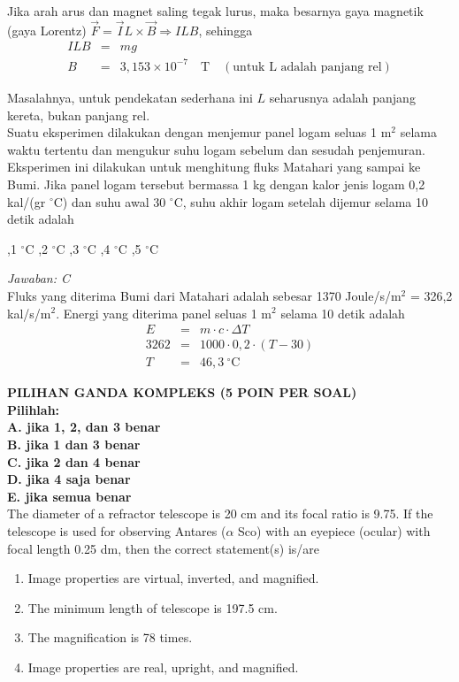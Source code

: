 \documentclass[11pt,fleqn]{exam}
\begin{document}
\begin{questions}
Jika arah arus dan magnet saling tegak lurus, maka besarnya gaya magnetik (gaya Lorentz) $\overrightarrow{F} = \overrightarrow{I}L \times \overrightarrow{B} \Rightarrow ILB$, sehingga
\begin{eqnarray*}
ILB &=& mg\\
B &=&3,153 \times 10^{-7} \quad \text{T} \quad (\text{untuk L adalah panjang rel})
\end{eqnarray*}

Masalahnya, untuk pendekatan sederhana ini $L$ seharusnya adalah panjang kereta, bukan panjang rel.\\


\question Suatu eksperimen dilakukan dengan menjemur panel logam seluas 1 m$^2$ selama waktu tertentu dan mengukur suhu logam sebelum dan sesudah penjemuran. Eksperimen ini dilakukan untuk menghitung fluks Matahari yang sampai ke Bumi. Jika panel logam tersebut bermassa 1 kg dengan kalor jenis logam 0,2 kal/(gr $^{\circ}$C) dan suhu awal 30 $^{\circ}$C, suhu akhir logam setelah dijemur selama 10 detik adalah
\begin{choices}
,1 $^{\circ}$C
,2 $^{\circ}$C
,3 $^{\circ}$C
,4 $^{\circ}$C
,5 $^{\circ}$C
\end{choices}


\textit{Jawaban: C}\\

Fluks yang diterima Bumi dari Matahari adalah sebesar 1370 Joule/s/m$^2$ = 326,2 kal/s/m$^{2}$. Energi yang diterima panel seluas 1 m$^2$ selama 10 detik adalah
\begin{eqnarray*}
E &=& m \cdot c \cdot \Delta T\\
3262 &=& 1000 \cdot 0,2 \cdot (T - 30)\\
T &=& 46,3 ~^{\circ}\text{C}
\end{eqnarray*}

\vspace{0.5cm}
\textbf{PILIHAN GANDA KOMPLEKS (5 POIN PER SOAL)\\ Pilihlah:}\\
\textbf{A. jika 1, 2, dan 3 benar}\\
\textbf{B. jika 1 dan 3 benar}\\
\textbf{C. jika 2 dan 4 benar}\\
\textbf{D. jika 4 saja benar}\\
\textbf{E. jika semua benar}\\


\question The diameter of a refractor telescope is 20 cm and its focal ratio is 9.75. If the telescope is used for observing Antares ($\alpha$ Sco) with an eyepiece (ocular) with focal length 0.25 dm, then the correct statement(s) is/are
\begin{enumerate}
\item Image properties are virtual, inverted, and magnified.
\item The minimum length of telescope is 197.5 cm.
\item The magnification is 78 times.
\item Image properties are real, upright, and magnified.
\end{enumerate}


\end{questions}
\end{document}
